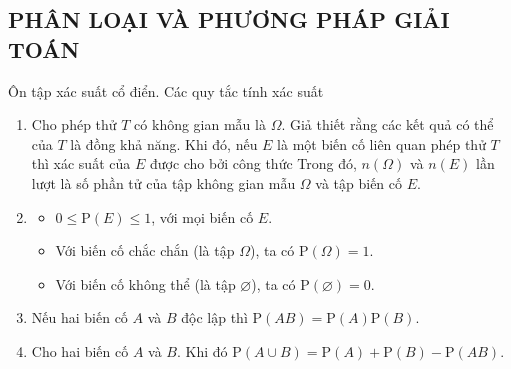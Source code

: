 \subsection{PHÂN LOẠI VÀ PHƯƠNG PHÁP GIẢI TOÁN}
\begin{dang}{Ôn tập xác suất cổ điển. Các quy tắc tính xác suất}
	\begin{enumerate}[\iconCH]
		\item 	{} Cho phép thử $T$ có không gian mẫu là $\Omega$. Giả thiết rằng các kết quả có thể của $T$ là đồng khả năng. Khi đó, nếu $E$ là một biến cố liên quan phép thử $T$ thì xác suất của $E$ được cho bởi công thức
		Trong đó, $n(\Omega)$ và $n(E)$ lần lượt là số phần tử của tập không gian mẫu $\Omega$ và tập biến cố $E$.
		\item {}
		\begin{boxkn}
			\begin{itemize}
				\item $0\le \mathrm{P}(E)\le 1$, với mọi biến cố $E$.
				\item Với biến cố chắc chắn (là tập $\Omega$), ta có  $\mathrm{P}(\Omega)=1$.
				\item Với biến cố không thể (là tập $\varnothing$), ta có  $\mathrm{P}(\varnothing)=0$.
			\end{itemize}
		\end{boxkn}
		\item {} Nếu hai biến cố $A$ và $B$ độc lập thì
		$\mathrm{P}(A B)=\mathrm{P}(A) \mathrm{P}(B).$
		\item {} Cho hai biến cố $A$ và $B$. Khi đó $\mathrm{P}(A \cup B)=\mathrm{P}(A)+\mathrm{P}(B)-\mathrm{P}(A B)$.
	\end{enumerate}
\end{dang}
\setcounter{vd}{0}
